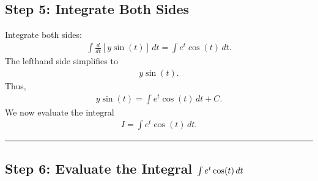 \documentclass[letterpaper,10pt,english]{sphinxmanual}
\begin{document}
\subsection{Step 5: Integrate Both Sides}
\label{\detokenize{Language/Science_language/ODE_calculus/course_MATH_3035/homework_assignments/index_pdf:step-5-integrate-both-sides}}
\sphinxAtStartPar
Integrate both sides:
\begin{equation*}
\begin{split}\int \frac{d}{dt}[y\sin(t)]\,dt
=
\int e^t\cos(t)\,dt.\end{split}
\end{equation*}
\sphinxAtStartPar
The left\sphinxhyphen{}hand side simplifies to
\begin{equation*}
\begin{split}y\sin(t).\end{split}
\end{equation*}
\sphinxAtStartPar
Thus,
\begin{equation*}
\begin{split}y\sin(t)
=
\int e^t\cos(t)\,dt + C.\end{split}
\end{equation*}
\sphinxAtStartPar
We now evaluate the integral
\begin{equation*}
\begin{split}I=\int e^t\cos(t)\,dt.\end{split}
\end{equation*}

\bigskip\hrule\bigskip



\subsection{Step 6: Evaluate the Integral \protect\(\int e^t\cos(t)\,dt\protect\)}
\label{\detokenize{Language/Science_language/ODE_calculus/course_MATH_3035/homework_assignments/index_pdf:step-6-evaluate-the-integral-int-e-t-cos-t-dt}}
\end{document}
